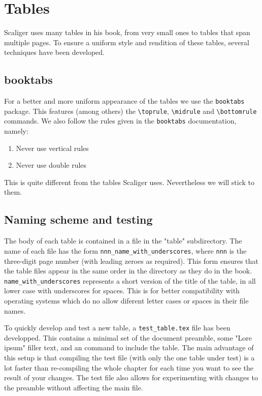\documentclass{report}
\begin{document}
\section{Tables}
Scaliger uses many tables in his book, from very small ones to tables that
span multiple pages.
To ensure a uniform style and rendition of these tables, several techniques
have been developed.

\subsection{booktabs}
For a better and more uniform appearance of the tables we use the
\verb+booktabs+ package. This features (among others) the
\verb+\toprule+, \verb+\midrule+ and \verb+\bottomrule+ commands.
We also follow the rules given in the \verb+booktabs+ documentation, namely:
\begin{enumerate}
\item Never use vertical rules
\item Never use double rules
\end{enumerate}
This is quite different from the tables Scaliger uses.
Nevertheless we will stick to them.

\subsection{Naming scheme and testing}
The body of each table is contained in a file in the "table" subdirectory.
The name of each file has the form \verb+nnn_name_with_underscores+, where
\verb+nnn+ is the three-digit page number (with leading zeroes as required).
This form ensures that the table files appear in the same order in the
directory as they do in the book.
\verb+name_with_underscores+ represents a short version of
the title of the table, in all lower case
with underscores for spaces.
This is for better compatibility with operating
systems which do no allow diferent letter cases or spaces in their file names.

To quickly develop and test a new table, a \verb+test_table.tex+ file has
been developped.
This contains a minimal set of the document preamble, some "Lore ipsum"
filler text, and an \verb++ command to include the table.
The main advantage of this setup is that compiling the test file (with only
the one table under test) is a lot faster than re-compiling the whole
chapter for each time you want to see the result of your changes.
The test file also allows for experimenting with changes to the preamble
without affecting the main file.
\end{document}
